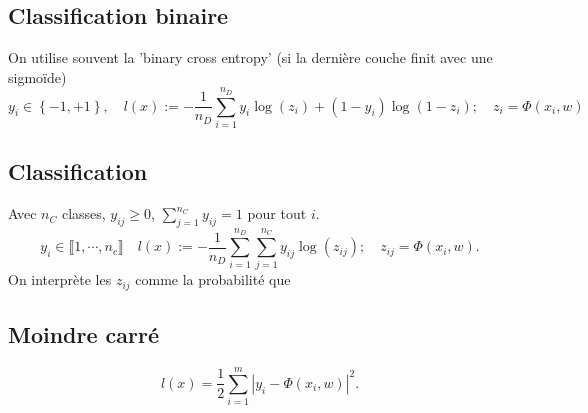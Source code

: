 \documentclass[11pt,a4paper, french]{article}
\newcommand{\ndata}{n_D}
\newcommand{\abs}[1]{\left|#1\right|}
\newcommand{\Set}[1]{\left\{#1\right\}}
\begin{document}
\subsection{Classification binaire}\label{subsec:}
%
On utilise souvent la 'binary cross entropy' (si la dernière couche finit avec une sigmoïde)
%
\begin{equation}\label{equation:}
y_i \in \Set{-1,+1},\quad l(x) := -\frac{1}{\ndata}\sum_{i=1}^{\ndata} y_i\log(z_i)+(1-y_i)\log(1-z_i);\quad z_i = \Phi(x_i,w)
\end{equation}
%
%
\subsection{Classification}\label{subsec:}
%
Avec $n_C$ classes, $y_{ij}\ge0 $, $\sum_{j=1}^{n_C}y_{ij}=1$ pour tout $i$. 
%
\begin{equation}\label{equation:}
y_i \in \llbracket 1,\cdots, n_c\rrbracket \quad l(x) := -\frac{1}{\ndata}\sum_{i=1}^{\ndata}\sum_{j=1}^{n_C} y_{ij}\log(z_{ij});\quad z_{ij} = \Phi(x_i,w).
\end{equation}
%
On interprète les $z_{ij}$ comme la probabilité que 
%
\subsection{Moindre carré}\label{subsec:}
%
%
\begin{equation}\label{equation:}
l(x)= \frac12\sum_{i=1}^m \abs{y_i-\Phi(x_i,w)}^2.
\end{equation}
%
%
\end{document}
